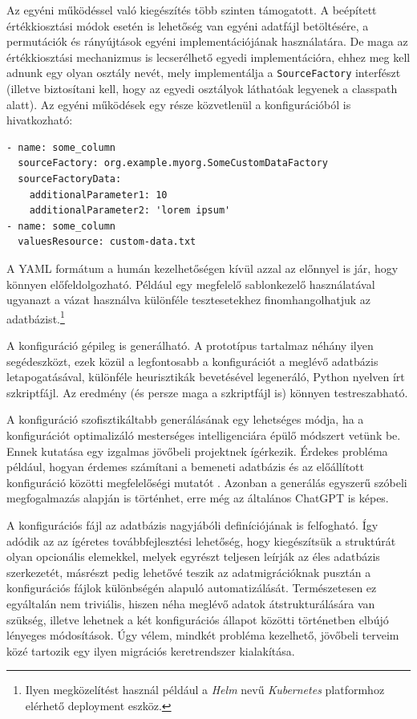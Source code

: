 \documentclass[
    parspace,
    noindent,
    nohyp,
]{elteiktdk}[2023/04/10]
\begin{document}
Az egyéni működéssel való kiegészítés több szinten támogatott.
A beépített értékkiosztási módok esetén is lehetőség van egyéni adatfájl betöltésére,
a permutációk és rányújtások egyéni implementációjának használatára.
De maga az értékkiosztási mechanizmus is lecserélhető egyedi implementációra,
ehhez meg kell adnunk egy olyan osztály nevét, mely implementálja a \texttt{SourceFactory} interfészt
(illetve biztosítani kell, hogy az egyedi osztályok láthatóak legyenek a classpath alatt).
Az egyéni működések egy része közvetlenül a konfigurációból is hivatkozható:

\vspace{-5pt}
\begin{verbatim}
- name: some_column
  sourceFactory: org.example.myorg.SomeCustomDataFactory
  sourceFactoryData:
    additionalParameter1: 10
    additionalParameter2: 'lorem ipsum'
- name: some_column
  valuesResource: custom-data.txt
\end{verbatim}
\vspace{-35pt}

A YAML formátum a humán kezelhetőségen kívül azzal az előnnyel is jár, hogy könnyen előfeldolgozható.
Például egy megfelelő sablonkezelő használatával ugyanazt a vázat használva
különféle tesztesetekhez finomhangolhatjuk az adatbázist.\footnote{
    Ilyen megközelítést használ például a \textit{Helm} nevű
    \textit{Kubernetes} platformhoz elérhető deployment eszköz.
}

A konfiguráció gépileg is generálható.
A prototípus tartalmaz néhány ilyen segédeszközt,
ezek közül a legfontosabb a konfigurációt a meglévő adatbázis letapogatásával,
különféle heurisztikák bevetésével legeneráló, Python nyelven írt szkriptfájl.
Az eredmény (és persze maga a szkriptfájl is) könnyen testreszabható.

A konfiguráció szofisztikáltabb generálásának egy lehetséges módja,
ha a konfigurációt optimalizáló mesterséges intelligenciára épülő módszert vetünk be.
Ennek kutatása egy izgalmas jövőbeli projektnek ígérkezik.
Érdekes probléma például, hogyan érdemes számítani a bemeneti adatbázis
és az előállított konfiguráció közötti megfelelőségi mutatót%
\cite{Erritali2016DocumentSimilarity}.
Azonban a generálás egyszerű szóbeli megfogalmazás alapján is történhet,
erre még az általános ChatGPT is képes.

A konfigurációs fájl az adatbázis nagyjábóli definíciójának is felfogható.
Így adódik az az ígéretes továbbfejlesztési lehetőség,
hogy kiegészítsük a struktúrát olyan opcionális elemekkel,
melyek egyrészt teljesen leírják az éles adatbázis szerkezetét,
másrészt pedig lehetővé teszik az adatmigrációknak
pusztán a konfigurációs fájlok különbségén alapuló automatizálását.
Természetesen ez egyáltalán nem triviális,
hiszen néha meglévő adatok átstrukturálására van szükség,
illetve lehetnek a két konfigurációs állapot közötti történetben elbújó lényeges módosítások.
Úgy vélem, mindkét probléma kezelhető,
jövőbeli terveim közé tartozik egy ilyen migrációs keretrendszer kialakítása.
\end{document}
